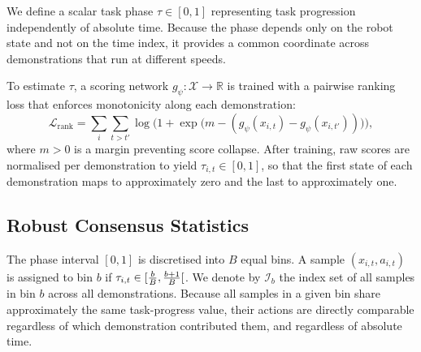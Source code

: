 \documentclass[a4paper, 10pt, conference]{ieeeconf}
\begin{document}
We define a scalar task phase $\tau \in [0,1]$ representing task progression independently of absolute time.
Because the phase depends only on the robot state and not on the time index, it provides a common coordinate across demonstrations that run at different speeds.

To estimate $\tau$, a scoring network $g_\psi : \mathcal{X} \to \mathbb{R}$ is trained with a pairwise ranking loss that enforces monotonicity along each demonstration:
\begin{equation}
    \mathcal{L}_{\mathrm{rank}} = \sum_i \sum_{t > t'}
    \log\!\bigl(1 + \exp\!\bigl(m - (g_\psi(x_{i,t}) - g_\psi(x_{i,t'}))\bigr)\bigr),
\end{equation}
where $m > 0$ is a margin preventing score collapse.
After training, raw scores are normalised per demonstration to yield $\tau_{i,t} \in [0,1]$, so that the first state of each demonstration maps to approximately zero and the last to approximately one.

\subsection{Robust Consensus Statistics}

The phase interval $[0,1]$ is discretised into $B$ equal bins.
A sample $(x_{i,t}, a_{i,t})$ is assigned to bin $b$ if $\tau_{i,t} \in \interval[open right]{\frac{b}{B}}{\frac{b+1}{B}}$.
We denote by $\mathcal{I}_b$ the index set of all samples in bin $b$ across all demonstrations.
Because all samples in a given bin share approximately the same task-progress value, their actions are directly comparable regardless of which demonstration contributed them, and regardless of absolute time.
\end{document}

